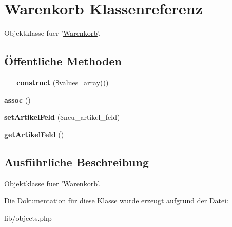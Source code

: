 \hypertarget{classWarenkorb}{\section{\-Warenkorb \-Klassenreferenz}
\label{classWarenkorb}
}


\-Objektklasse fuer '\hyperlink{classWarenkorb}{\-Warenkorb}'.  


\subsection*{Öffentliche \-Methoden}
\begin{DoxyCompactItemize}
\item 
\hypertarget{classWarenkorb_a4bfc900376acfd4d2f7209d4a5e56bf9}{{\bfseries \-\_\-\-\_\-construct} (\$values=array())}\label{classWarenkorb_a4bfc900376acfd4d2f7209d4a5e56bf9}

\item 
\hypertarget{classWarenkorb_a4397c99a3a18b1851aaa517f88025e2b}{{\bfseries assoc} ()}\label{classWarenkorb_a4397c99a3a18b1851aaa517f88025e2b}

\item 
\hypertarget{classWarenkorb_ad2f4c6f92ce600725ddea544a5f219c5}{{\bfseries set\-Artikel\-Feld} (\$neu\-\_\-artikel\-\_\-feld)}\label{classWarenkorb_ad2f4c6f92ce600725ddea544a5f219c5}

\item 
\hypertarget{classWarenkorb_af18c96f0229f43bbeed4800a5c834172}{{\bfseries get\-Artikel\-Feld} ()}\label{classWarenkorb_af18c96f0229f43bbeed4800a5c834172}

\end{DoxyCompactItemize}


\subsection{\-Ausführliche \-Beschreibung}
\-Objektklasse fuer '\hyperlink{classWarenkorb}{\-Warenkorb}'. 

\-Die \-Dokumentation für diese \-Klasse wurde erzeugt aufgrund der \-Datei\-:\begin{DoxyCompactItemize}
\item 
lib/objects.\-php\end{DoxyCompactItemize}
